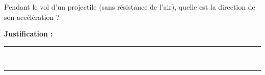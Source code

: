 Pendant le vol d'un projectile (sans résistance de l'air), quelle est la direction de son accélération ?

\choices

\noindent\textbf{Justification :} \hrulefill \\[2.5ex]
\rule{\linewidth}{0.4pt} \\[2.5ex]
\rule{\linewidth}{0.4pt}
\vfill
